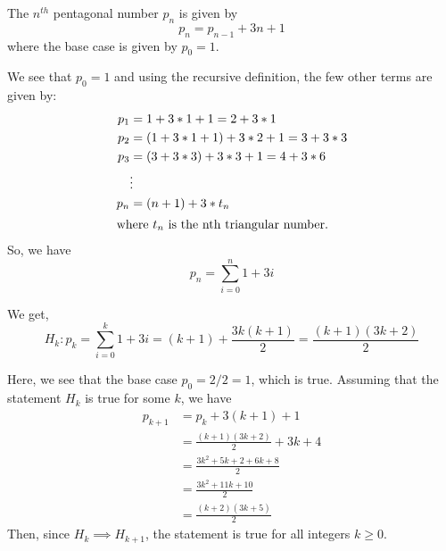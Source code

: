 \begin{questions}
    \begin{solution}
        The $n^{th}$ pentagonal number $p_n$ is given by $$p_{n}
        =p_{n-1} + 3n +1$$
        where the base case is given by $p_0=1$.
    \end{solution}

    \begin{solution}
        We see that $p_0 = 1$ and using the recursive definition, 
        the few other terms are given by:
        \begin{align*}
            p_1 &= 1 +3*1+1=2+3*1\\
            p_2 &= \left(1+3*1+1\right) +3*2+1
            =3+3*3\\
            p_3 &= \left(3+3*3\right)+3*3+1
            =4+3*6\\
            &\vdots\\
            p_n &= (n+1)+3*t_n\\
            \shortintertext{where $t_n$ is the nth triangular number.}
        \end{align*}
        So, we have
        $$p_n = \sum_{i=0}^n{1+3i}$$
    \end{solution}

    \begin{solution}
        We get, 
        \begin{equation}
            H_k: p_k = \sum_{i=0}^k{1+3i} = (k+1)+\frac{3k(k+1)}{2}
        =\frac{(k+1)(3k+2)}{2}
        \end{equation}

        Here, we see that the base case $p_0=2/2=1$, which is true. 
        Assuming that the statement $H_k$ is true for some $k$, we 
        have
        \begin{align*}
            p_{k+1} &= p_k+3(k+1)+1\\
            &=\frac{(k+1)(3k+2)}{2} +3k+4\\
            &=\frac{3k^2+5k+2+6k+8}{2}\\
            &=\frac{3k^2+11k+10}{2}\\
            &=\frac{(k+2)(3k+5)}{2}
        \end{align*}
        Then, since $H_k\implies H_{k+1}$, the statement is true for
        all integers $k\ge 0$.
    \end{solution}
\end{questions}
